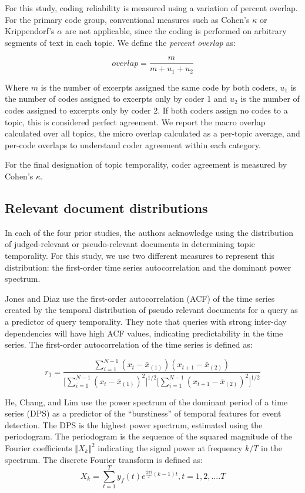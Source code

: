 \documentclass[runningheads,a4paper]{llncs}
\begin{document}
For this study, coding reliability is measured using a variation of percent overlap. For the primary code group, conventional measures such as Cohen's $\kappa$ or Krippendorf's $\alpha$ are not applicable, since the coding is performed on arbitrary segments of text in each topic. We define the \emph{percent overlap} as:

\[
overlap = \frac{m}{m + u_1 + u_2} 
\]

Where $m$ is the number of excerpts assigned the same code by both coders, $u_1$ is the number of codes assigned to excerpts only by coder 1 and $u_2$ is the number of codes assigned to excerpts only by coder 2. If both coders assign no codes to a topic, this is considered perfect agreement. We report the macro overlap calculated over all topics, the micro overlap calculated as a per-topic average, and per-code overlaps to understand coder agreement within each category.

For the final designation of topic temporality, coder agreement is measured by Cohen's $\kappa$.

\subsection{Relevant document distributions}

In each of the four prior studies, the authors acknowledge using the distribution of judged-relevant or pseudo-relevant documents in determining topic temporality. For this study, we use two different measures to represent this distribution: the first-order time series autocorrelation and the dominant power spectrum.

Jones and Diaz \cite{Jones2007} use the first-order autocorrelation (ACF) of the time series created by the temporal distribution of pseudo relevant documents for a query as a predictor of query temporality. They note that queries with strong inter-day dependencies will have high ACF values, indicating predictability in the time series. The first-order autocorrelation of the time series is defined as:

\begin{equation}
r_1 = \dfrac{\sum_{i=1}^{N-1} (x_t - \bar{x}_{(1)})(x_{t+1} - \bar{x}_{(2)})}{ \big [ \sum_{i=1}^{N-1}  (x_t - \bar{x}_{(1)})^2 \big ] ^{1/2} \big [\sum_{i=1}^{N-1} (x_{t+1} - \bar{x}_{(2)})^2 \big ]^{1/2}}
\end{equation}

He, Chang, and Lim \cite{He2007} use the power spectrum of the dominant period of a time series (DPS) as a predictor of the ``burstiness'' of temporal features for event detection. The DPS is the highest power spectrum, estimated using the periodogram. The periodogram is the sequence of the squared magnitude of the Fourier coefficients $\Vert X_k \Vert^2$ indicating the signal power at frequency $k/T$ in the spectrum.  The discrete Fourier transform is defined as: 
\begin{equation}
X_k = \sum_{t=1}^T y_f(t)e^{\frac{2\pi i}{T}(k - 1)t}, t=1,2,....T
\end{equation}
\end{document}
